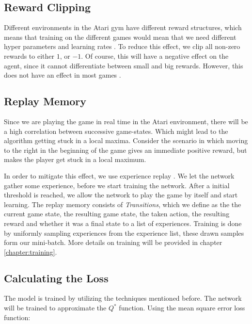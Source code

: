 \documentclass{article}
\begin{document}
\subsection{Reward Clipping}

Different environments in the Atari gym have different reward structures, which means that training on the different games would mean that we need different hyper parameters and learning rates . To reduce this effect, we clip all non-zero rewards to either $1$, or $-1$. Of course, this will have a negative effect on the agent, since it cannot differentiate between small and big rewards. However, this does not have an effect in most games \cite{mnih2015human}.


\subsection{Replay Memory}
Since we are playing the game in real time in the Atari environment, there will be a high correlation between successive game-states. Which might lead to the algorithm getting stuck in a local maxima. Consider the scenario in which moving to the right in the beginning of the game gives an immediate positive reward, but makes the player get stuck in a local maximum.

In order to mitigate this effect, we use experience replay \cite{mnih2013playing}. We let the network gather some experience, before we start training the network. After a initial threshold is reached, we allow the network to play the game by itself and start learning. The replay memory consists of \textit{Transitions}, which we define as the the current game state, the resulting game state, the taken action, the resulting reward and whether it was a final state to a list of experiences. Training is done by uniformly sampling experiences from the experience list, these drawn samples form our mini-batch. More details on training will be provided in chapter \ref{chapter:training}.

\subsection{Calculating the Loss} \label{chapter:loss}

The model is trained by utilizing the techniques mentioned before. The network will be trained to approximate the $Q^*$ function. Using the mean square error loss function:
\end{document}
